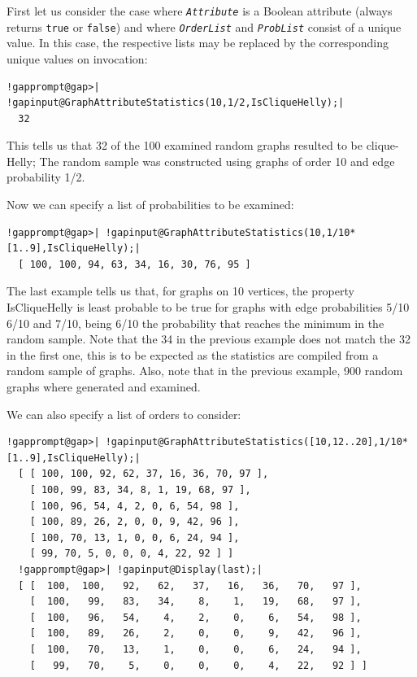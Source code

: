 \documentclass[a4paper,11pt]{report}
\begin{document}
{{{First let us consider the case where \mbox{\texttt{\mdseries\slshape Attribute}} is a Boolean attribute (always returns \texttt{true} or \texttt{false}) and where \mbox{\texttt{\mdseries\slshape OrderList}} and \mbox{\texttt{\mdseries\slshape ProbList}} consist of a unique value. In this case, the respective lists may be replaced
by the corresponding unique values on invocation: 

 
\begin{Verbatim}[commandchars=!@|,fontsize=\small,frame=single,label=Example]
  !gapprompt@gap>| !gapinput@GraphAttributeStatistics(10,1/2,IsCliqueHelly);|
  32
\end{Verbatim}
 

This tells us that 32 of the 100 examined random graphs resulted to be
clique-Helly; The random sample was constructed using graphs of order 10 and
edge probability 1/2. 

Now we can specify a list of probabilities to be examined: 

 
\begin{Verbatim}[commandchars=!@|,fontsize=\small,frame=single,label=Example]
  !gapprompt@gap>| !gapinput@GraphAttributeStatistics(10,1/10*[1..9],IsCliqueHelly);|
  [ 100, 100, 94, 63, 34, 16, 30, 76, 95 ]
\end{Verbatim}
 

The last example tells us that, for graphs on 10 vertices, the property
IsCliqueHelly is least probable to be true for graphs with edge probabilities
5/10 6/10 and 7/10, being 6/10 the probability that reaches the minimum in the
random sample. Note that the 34 in the previous example does not match the 32
in the first one, this is to be expected as the statistics are compiled from a
random sample of graphs. Also, note that in the previous example, 900 random
graphs where generated and examined. 

We can also specify a list of orders to consider: 

 
\begin{Verbatim}[commandchars=!@|,fontsize=\small,frame=single,label=Example]
  !gapprompt@gap>| !gapinput@GraphAttributeStatistics([10,12..20],1/10*[1..9],IsCliqueHelly);|
  [ [ 100, 100, 92, 62, 37, 16, 36, 70, 97 ], 
    [ 100, 99, 83, 34, 8, 1, 19, 68, 97 ], 
    [ 100, 96, 54, 4, 2, 0, 6, 54, 98 ], 
    [ 100, 89, 26, 2, 0, 0, 9, 42, 96 ], 
    [ 100, 70, 13, 1, 0, 0, 6, 24, 94 ], 
    [ 99, 70, 5, 0, 0, 0, 4, 22, 92 ] ]
  !gapprompt@gap>| !gapinput@Display(last);|
  [ [  100,  100,   92,   62,   37,   16,   36,   70,   97 ],
    [  100,   99,   83,   34,    8,    1,   19,   68,   97 ],
    [  100,   96,   54,    4,    2,    0,    6,   54,   98 ],
    [  100,   89,   26,    2,    0,    0,    9,   42,   96 ],
    [  100,   70,   13,    1,    0,    0,    6,   24,   94 ],
    [   99,   70,    5,    0,    0,    0,    4,   22,   92 ] ]
\end{Verbatim}
 

}}}
\end{document}
